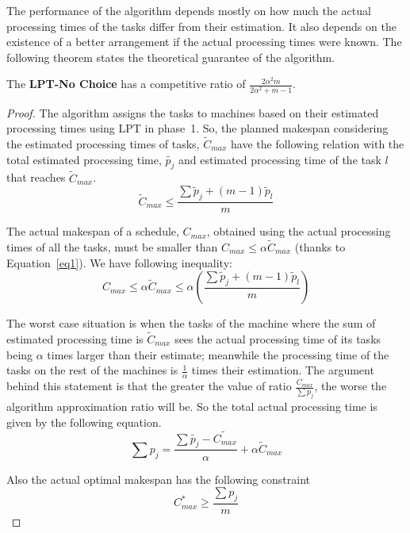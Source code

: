 \documentclass[twocolumn]{svjour3}
\begin{document}
The performance of the algorithm depends mostly on how much the actual
processing times of the tasks differ from their estimation. It also depends on the
existence of a better arrangement if the actual processing times were
known. The following theorem states the theoretical guarantee of the
algorithm.

\begin{theorem}
\label{th:strat1-ub}
The \textbf{LPT-No Choice} has a competitive ratio of $ \frac{2\alpha^{2}m}{2\alpha^{2}+ m-1}$.
\end{theorem} 

\begin{proof}
  The algorithm assigns the tasks to machines based on their
  estimated processing times using LPT in phase~1. So, the
  planned makespan considering the estimated processing times of tasks,
  $\tilde{C}_{max}$ have the following relation with the total
  estimated processing time, $\tilde{p_j}$ and estimated processing
  time of the task  $l$ that reaches $\tilde{C}_{max}$.
\begin{equation}\label{eq2}
\tilde C_{max}\leq  \frac{\sum{\tilde p_j + (m-1) \tilde p_l} }{m}
\end{equation}

The actual makespan of a schedule, $C_{max}$, obtained using the
actual processing times of all the tasks, must be smaller than $C_{max} \leq \alpha
\tilde C_{max}$ (thanks to Equation~\ref{eq1}). We
have following inequality:
\begin{equation}\label{eq3}
  C_{max}\leq \alpha \tilde C_{max}\leq \alpha \left ( \frac{\sum{\tilde p_j + (m-1) \tilde p_l} }{m} \right )
\end{equation} 

The worst case situation is when the tasks of the machine where the
sum of estimated processing time is $\tilde C_{max}$ sees the actual
processing time of its tasks being $\alpha$ times larger than their
estimate; meanwhile the processing time of the tasks on the rest of the
machines is $\frac{1}{\alpha}$ times their estimation. The argument
behind this statement is that the greater the value of ratio
$\frac{C_{max}}{\sum{p_j}}$, the worse the algorithm approximation
ratio will be. So the total actual processing time is
given by the following equation.
 \begin{equation}\label{eq4}
 \sum {p_j} = \frac{\sum \tilde{p_j}- \tilde{C_{max}}}{\alpha} + \alpha \tilde C_{max}
 \end{equation}
 
 Also the actual optimal makespan has the following constraint
 \begin{equation}\nonumber 
C_{max}^{*}\geq \frac{\sum {p_j}}{m}
\end{equation}


\end{proof}
\end{document}
